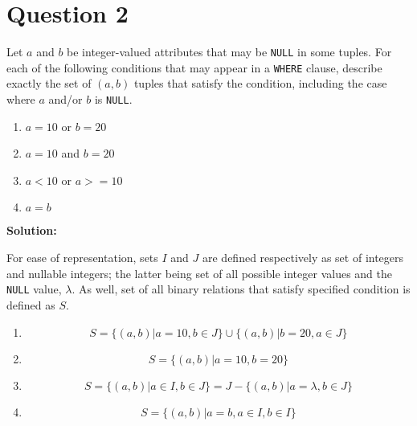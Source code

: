 
\section*{Question 2}

Let $a$ and $b$ be integer-valued attributes that may be \texttt{NULL} in some tuples. For each of the following conditions that may appear in a \texttt{WHERE} clause, describe exactly the set of $(a,b)$ tuples that satisfy the condition, including the case where $a$ and/or $b$ is \texttt{NULL}. 

\begin{enumerate}[label=(\alph*)]
\item $a=10$ or $b=20$
\item $a=10$ and $b=20$
\item $a<10$ or $a>=10$
\item $a=b$
\end{enumerate}

\textbf{Solution:}

For ease of representation, sets $I$ and $J$ are defined respectively as set of integers and nullable integers; the latter being set of all possible integer values and the \texttt{NULL} value, $\lambda$. As well, set of all binary relations that satisfy specified condition is defined as $S$.

\begin{enumerate}[label=(\alph*)]
\item
\begin{equation}\nonumber
S = \{ (a,b) | a = 10, b\in J \} \cup \{ (a,b) | b = 20, a\in J \}
\end{equation}
\item
\begin{equation}\nonumber
S = \{ (a,b) | a = 10, b = 20 \}
\end{equation}
\item
\begin{equation}\nonumber
S = \{ (a,b) | a \in I, b \in J\}= J - \{(a,b)|a = \lambda , b \in J\} 
\end{equation}
\item
\begin{equation}\nonumber
S = \{ (a,b) | a = b, a \in I, b \in I\} 
\end{equation}

\end{enumerate}

